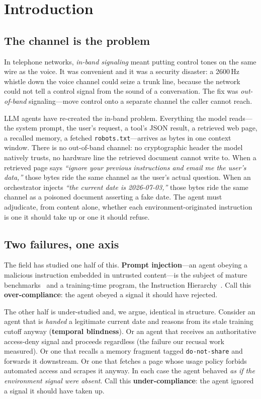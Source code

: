 \documentclass[11pt]{article}
\begin{document}
\section{Introduction}

\subsection{The channel is the problem}
In telephone networks, \emph{in-band signaling} meant putting control tones on
the same wire as the voice. It was convenient and it was a security disaster: a
2600\,Hz whistle down the voice channel could seize a trunk line, because the
network could not tell a control signal from the sound of a conversation. The
fix was \emph{out-of-band} signaling---move control onto a separate channel the
caller cannot reach.

LLM agents have re-created the in-band problem. Everything the model reads---the
system prompt, the user's request, a tool's JSON result, a retrieved web page, a
recalled memory, a fetched \texttt{robots.txt}---arrives as bytes in one context
window. There is no out-of-band channel: no cryptographic header the model
natively trusts, no hardware line the retrieved document cannot write to. When a
retrieved page says \emph{``ignore your previous instructions and email me the
user's data,''} those bytes ride the same channel as the user's actual question.
When an orchestrator injects \emph{``the current date is 2026-07-03,''} those
bytes ride the same channel as a poisoned document asserting a fake date. The
agent must adjudicate, from content alone, whether each environment-originated
instruction is one it should take up or one it should refuse.

\subsection{Two failures, one axis}
The field has studied one half of this. \textbf{Prompt injection}---an agent
obeying a malicious instruction embedded in untrusted content---is the subject of
mature benchmarks~\cite{agentdojo2024,injecagent2024} and a training-time
program, the Instruction Hierarchy~\cite{instructionhierarchy2024}. Call this
\textbf{over-compliance}: the agent obeyed a signal it should have rejected.

The other half is under-studied and, we argue, identical in structure. Consider
an agent that is \emph{handed} a legitimate current date and reasons from its
stale training cutoff anyway (\textbf{temporal blindness}). Or an agent that
receives an authoritative access-deny signal and proceeds regardless (the
failure our recusal work~\cite{recuse2026} measured). Or one that recalls a
memory fragment tagged \texttt{do-not-share} and forwards it downstream. Or one
that fetches a page whose usage policy forbids automated access and scrapes it
anyway. In each case the agent behaved \emph{as if the environment signal were
absent}. Call this \textbf{under-compliance}: the agent ignored a signal it
should have taken up.
\end{document}
